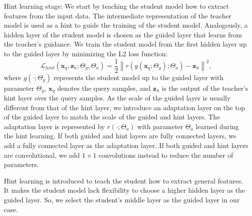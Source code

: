 \documentclass[letterpaper]{article} %
\begin{document}
Hint learning stage: We start by teaching the student model how to extract features from the input data. The intermediate representation of the teacher model is used as a hint to guide the training of the student model. Analogously, a hidden layer of the student model is chosen as the guided layer that learns from the teacher's guidance. We train the student model from the first hidden layer up to the guided layer by minimizing the L2 loss function:
\begin{equation}\label{eqn:hint-loss}
\mathcal{ L }_{ hint }({ \textbf{x} }_{ q },\textbf{z}_{ h };{ \Theta  }_{ g },{ \Theta  }_{ a })=\frac { 1 }{ 2 } { \left\| r(g({ \textbf{x} }_{ q };{ \Theta  }_{ g });{ \Theta  }_{ a })-\textbf{z}_{ h } \right\|  }^{ 2 },
\end{equation}
where $g(\cdot;\Theta_g)$ represents the student model up to the guided layer with parameter $\Theta_g$, $\textbf{x}_{ q }$ denotes the query samples, and $\textbf{z}_h$ is the output of the teacher's hint layer over the query samples. As the scale of the guided layer is usually different from that of the hint layer, we introduce an adaptation layer on the top of the guided layer to match the scale of the guided and hint layers. The adaptation layer is represented by $r(\cdot;\Theta_a)$ with parameter $\Theta_a$ learned during the hint learning. If both guided and hint layers are fully connected layers, we add a fully connected layer as the adaptation layer. If both guided and hint layers are convolutional, we add $1\times 1$ convolutions instead to reduce the number of parameters.

Hint learning is introduced to teach the student how to extract general features. It makes the student model lack flexibility to choose a higher hidden layer as the guided layer. So, we select the student's middle layer as the guided layer in our case.
\end{document}
